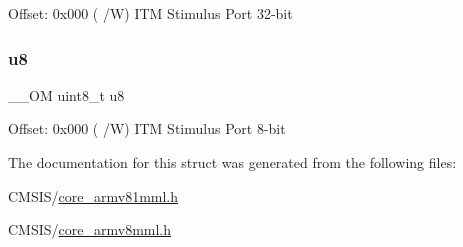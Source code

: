 Offset\+: 0x000 ( /W) I\+TM Stimulus Port 32-\/bit \mbox{\label{struct_i_t_m___type_a4c0550e859d614c607bd4b575f05425c}} 
\subsubsection{\texorpdfstring{u8}{u8}}
{\footnotesize\ttfamily \+\_\+\+\_\+\+OM uint8\+\_\+t u8}

Offset\+: 0x000 ( /W) I\+TM Stimulus Port 8-\/bit 

The documentation for this struct was generated from the following files\+:\begin{DoxyCompactItemize}
\item 
C\+M\+S\+I\+S/\mbox{\hyperlink{core__armv81mml_8h}{core\+\_\+armv81mml.\+h}}\item 
C\+M\+S\+I\+S/\mbox{\hyperlink{core__armv8mml_8h}{core\+\_\+armv8mml.\+h}}\end{DoxyCompactItemize}
